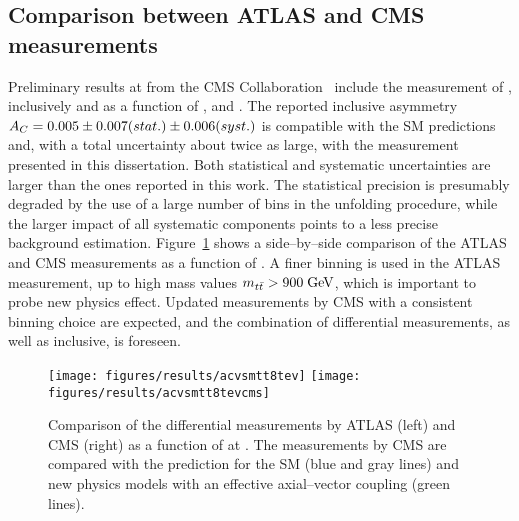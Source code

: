 \subsection{Comparison between ATLAS and CMS measurements}

Preliminary results at \eighttev{} from the CMS
Collaboration~\cite{CMS-PAS-TOP-12-033} include the measurement of
\ac{}, inclusively and as a function of \mtt{}, \pttt{} and \ytt{}.
The reported inclusive asymmetry
\mbox{$A_C{}=0.005\pm0.007(stat.)\pm0.006(syst.)$} is compatible with the SM
predictions and, with a total uncertainty about twice as large, with
the measurement presented in this dissertation. Both
statistical and systematic uncertainties are larger than the ones
reported in this work. The statistical precision is presumably
degraded by the use of a large number of \dy{} bins in the unfolding
procedure, while the larger impact of all systematic components
points to a less precise background estimation.
Figure~\ref{fig:comparediff8tev} shows a side--by--side comparison of
the ATLAS and CMS measurements as a function of \mtt{}. A finer
binning is used in the ATLAS measurement, up to
high mass values $m_{t\bar{t}}{}>900\; \mathrm{GeV}$, which is important to probe new
physics effect. Updated measurements by CMS with a consistent binning
choice are expected, and the combination of differential measurements,
as well as inclusive, is foreseen.

\begin{figure}[!htb]\centering
  \texttt{[image: figures/results/acvsmtt8tev]}
  \texttt{[image: figures/results/acvsmtt8tevcms]}
  \caption{Comparison of the differential \ac{} measurements by ATLAS
    (left) and CMS (right) as a function of \mtt{} at \eighttev{}. The measurements
    by CMS are compared with the prediction for the SM (blue and gray lines) and
    new physics models with an effective axial--vector coupling (green lines).} 
  \label{fig:comparediff8tev}
\end{figure}
